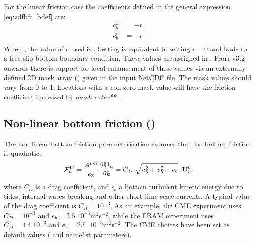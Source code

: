 \documentclass[../tex_main/NEMO_manual]{subfiles}
\begin{document}
For the linear friction case the coefficients defined in the general 
expression \autoref{eq:zdfbfr_bdef} are: 
\begin{equation} \label{eq:zdfbfr_linbfr_b}
\begin{split}
 c_b^u &= - r\\
 c_b^v &= - r\\
\end{split}
\end{equation}
When , the value of $r$ used is . 
Setting  is equivalent to setting $r=0$ and leads to a free-slip 
bottom boundary condition. These values are assigned in . 
From v3.2 onwards there is support for local enhancement of these values 
via an externally defined 2D mask array () given
in the  input NetCDF file. The mask values should vary from 0 to 1. 
Locations with a non-zero mask value will have the friction coefficient increased 
by $mask\_value$**.

\subsection{Non-linear bottom friction (\protect{})}
\label{subsec:ZDF_bfr_nonlinear}

The non-linear bottom friction parameterisation assumes that the bottom 
friction is quadratic: 
\begin{equation} \label{eq:zdfbfr_nonlinear}
{\cal F}_h^\textbf{U} = \frac{A^{vm}}{e_3 }\frac{\partial \textbf {U}_h 
}{\partial k}=C_D \;\sqrt {u_b ^2+v_b ^2+e_b } \;\; \textbf {U}_h^b 
\end{equation}
where $C_D$ is a drag coefficient, and $e_b $ a bottom turbulent kinetic energy 
due to tides, internal waves breaking and other short time scale currents. 
A typical value of the drag coefficient is $C_D = 10^{-3} $. As an example, 
the CME experiment \citep{Treguier_JGR92} uses $C_D = 10^{-3}$ and 
$e_b = 2.5\;10^{-3}$m$^2$\;s$^{-2}$, while the FRAM experiment \citep{Killworth1992} 
uses $C_D = 1.4\;10^{-3}$ and $e_b =2.5\;\;10^{-3}$m$^2$\;s$^{-2}$. 
The CME choices have been set as default values ( and  
namelist parameters).
\end{document}
